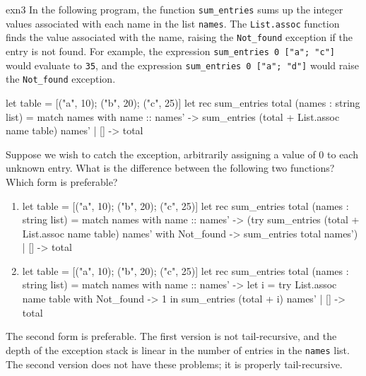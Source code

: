 %
\begin{exercise}{exn3}
In the following program, the function \lstinline+sum_entries+ sums up the integer values associated with
each name in the list \lstinline+names+.  The \lstinline+List.assoc+ function finds the value associated with
the name, raising the \lstinline+Not_found+ exception if the entry is not found.  For example, the
expression \lstinline+sum_entries 0 ["a"; "c"]+ would evaluate to \lstinline+35+, and the expression
\lstinline+sum_entries 0 ["a"; "d"]+ would raise the \lstinline+Not_found+ exception.

\begin{center}
\begin{ocaml}
let table = [("a", 10); ("b", 20); ("c", 25)]
let rec sum_entries total (names : string list) =
   match names with
      name :: names' ->
         sum_entries (total + List.assoc name table) names'
    | [] ->
         total
\end{ocaml}
\end{center}
%
Suppose we wish to catch the exception, arbitrarily assigning a value of 0 to each unknown entry.
What is the difference between the following two functions?  Which form is preferable?

\begin{enumerate}
\item 
\begin{center}
\begin{ocaml}
let table = [("a", 10); ("b", 20); ("c", 25)]
let rec sum_entries total (names : string list) =
   match names with
      name :: names' ->
         (try sum_entries (total + List.assoc name table) names' with
             Not_found ->
                sum_entries total names')
    | [] ->
         total
\end{ocaml}
\end{center}

\item
\begin{center}
\begin{ocaml}
let table = [("a", 10); ("b", 20); ("c", 25)]
let rec sum_entries total (names : string list) =
   match names with
      name :: names' ->
         let i =
            try List.assoc name table with
               Not_found  ->
                  1
         in
            sum_entries (total + i) names'
    | [] ->
         total
\end{ocaml}
\end{center}
\end{enumerate}

\begin{answer}\ifanswers
The second form is preferable.  The first version is not tail-recursive, and the depth of the
exception stack is linear in the number of entries in the \lstinline+names+ list.  The second version
does not have these problems; it is properly tail-recursive.
\fi\end{answer}
\end{exercise}


